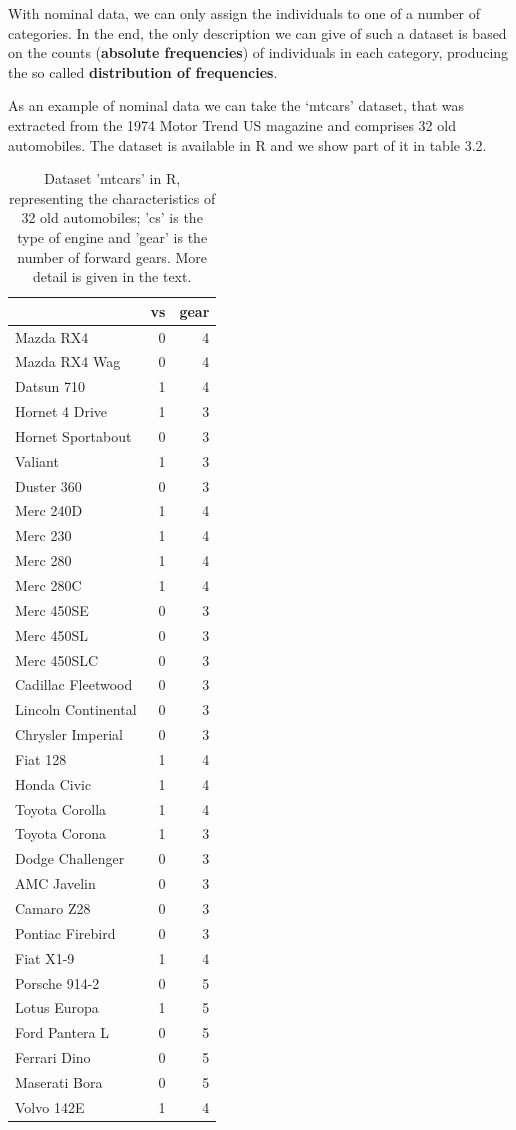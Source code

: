 \documentclass[a4paper,12pt,oneside]{book}
\begin{document}
With nominal data, we can only assign the individuals to one of a number of categories. In the end, the only description we can give of such a dataset is based on the counts (\textbf{absolute frequencies}) of individuals in each category, producing the so called \textbf{distribution of frequencies}.

As an example of nominal data we can take the `mtcars' dataset, that was extracted from the 1974 Motor Trend US magazine and comprises 32 old automobiles. The dataset is available in R and we show part of it in table 3.2.

\begin{table}

\caption{\label{tab:unnamed-chunk-4}Dataset 'mtcars' in R, representing the characteristics of 32 old automobiles; 'cs' is the type of engine and 'gear' is the number of forward gears. More detail is given in the text.}
\centering
\begin{tabular}[t]{lrr}
\toprule
  & vs & gear\\
\midrule
Mazda RX4 & 0 & 4\\
Mazda RX4 Wag & 0 & 4\\
Datsun 710 & 1 & 4\\
Hornet 4 Drive & 1 & 3\\
Hornet Sportabout & 0 & 3\\
\addlinespace
Valiant & 1 & 3\\
Duster 360 & 0 & 3\\
Merc 240D & 1 & 4\\
Merc 230 & 1 & 4\\
Merc 280 & 1 & 4\\
\addlinespace
Merc 280C & 1 & 4\\
Merc 450SE & 0 & 3\\
Merc 450SL & 0 & 3\\
Merc 450SLC & 0 & 3\\
Cadillac Fleetwood & 0 & 3\\
\addlinespace
Lincoln Continental & 0 & 3\\
Chrysler Imperial & 0 & 3\\
Fiat 128 & 1 & 4\\
Honda Civic & 1 & 4\\
Toyota Corolla & 1 & 4\\
\addlinespace
Toyota Corona & 1 & 3\\
Dodge Challenger & 0 & 3\\
AMC Javelin & 0 & 3\\
Camaro Z28 & 0 & 3\\
Pontiac Firebird & 0 & 3\\
\addlinespace
Fiat X1-9 & 1 & 4\\
Porsche 914-2 & 0 & 5\\
Lotus Europa & 1 & 5\\
Ford Pantera L & 0 & 5\\
Ferrari Dino & 0 & 5\\
\addlinespace
Maserati Bora & 0 & 5\\
Volvo 142E & 1 & 4\\
\bottomrule
\end{tabular}
\end{table}
\end{document}
